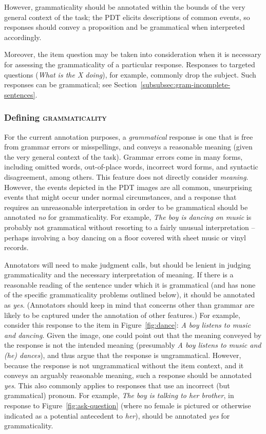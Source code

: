 \documentclass[12pt]{article}
\newcommand{\feat}[1]{\textsc{#1}}
\begin{document}
However, grammaticality should be annotated within the bounds of the very general context of the task; the PDT elicits descriptions of common events, so responses should convey a proposition and be grammatical when interpreted accordingly.

Moreover, the item question may be taken into consideration when it is necessary for assessing the grammaticality of a particular response. Responses to targeted questions (\textit{What is the X doing}), for example, commonly drop the subject. Such responses can be grammatical; see Section~\ref{subsubsec:gram-incomplete-sentences}.

\subsubsection{Defining \feat{grammaticality}} For the current annotation purposes, a \textit{grammatical} response is one that is free from grammar errors or misspellings, and conveys a reasonable meaning (given the very general context of the task). Grammar errors come in many forms, including omitted words, out-of-place words, incorrect word forms, and syntactic disagreement, among others. This feature does not directly consider \textit{meaning}. However, the events depicted in the PDT images are all common, unsurprising events that might occur under normal circumstances, and a response that requires an unreasonable interpretation in order to be grammatical should be annotated \textit{no} for grammaticality. For example, \textit{The boy is dancing on music} is probably not grammatical without resorting to a fairly unusual interpretation -- perhaps involving a boy dancing on a floor covered with sheet music or vinyl records.

Annotators will need to make judgment calls, but should be lenient in judging grammaticality and the necessary interpretation of meaning. If there is a reasonable reading of the sentence under which it is grammatical (and has none of the specific grammaticality problems outlined below), it should be annotated as \textit{yes}. (Annotators should keep in mind that concerns other than grammar are likely to be captured under the annotation of other features.) For example, consider this response to the item in Figure~\ref{fig:dance}: \textit{A boy listens to music and dancing}. Given the image, one could point out that the meaning conveyed by the response is not the intended meaning (presumably \textit{A boy listens to music and (he) dances}), and thus argue that the response is ungrammatical. However, because the response is not ungrammatical without the item context, and it conveys an arguably reasonable meaning, such a response should be annotated \textit{yes}. This also commonly applies to responses that use an incorrect (but grammatical) pronoun. For example, \textit{The boy is talking to her brother}, in response to Figure~\ref{fig:ask-question} (where no female is pictured or otherwise indicated as a potential antecedent to \textit{her}), should be annotated \textit{yes} for grammaticality.
\end{document}
